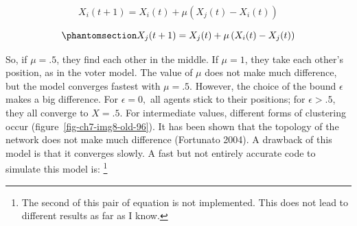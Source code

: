 \documentclass[
  a4paper,
  DIV=11,
  numbers=noendperiod,
  oneside]{scrreprt}
\begin{document}
\[X_{i}(t + 1) = X_{i}(t) + \mu(X_{j}(t) - X_{i}(t))\]

\begin{equation}\phantomsection\label{eq-ch7-2-old-51}{X_{j}(t + 1) = X_{j}(t) + \mu\left( X_{i}(t) - X_{j}(t) \right)}\end{equation}

So, if \(\mu = .5\), they find each other in the middle. If \(\mu = 1\),
they take each other's position, as in the voter model. The value of
\(\mu\) does not make much difference, but the model converges fastest
with \(\mu = .5\). However, the choice of the bound \(\epsilon\) makes a
big difference. For \(\epsilon = 0,\) all agents stick to their
positions; for \(\epsilon > .5\), they all converge to \(X = .5\). For
intermediate values, different forms of clustering occur
(figure~\ref{fig-ch7-img8-old-96}). It has been shown that the topology
of the network does not make much difference (Fortunato 2004). A
drawback of this model is that it converges slowly. A fast but not
entirely accurate code to simulate this model is: \footnote{The second
  of this pair of equation is not implemented. This does not lead to
  different results as far as I know.}
\end{document}

